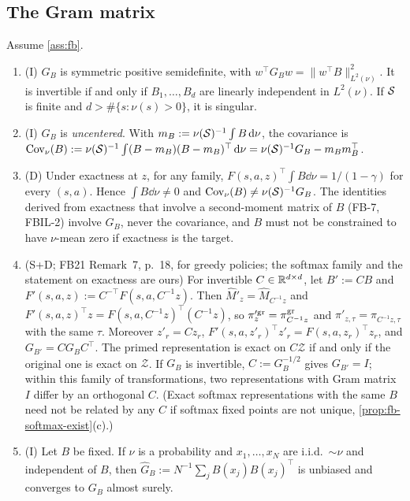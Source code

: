 \subsection{The Gram matrix}\label{sec:fb-gram}

\begin{proposition}\label{prop:fb-gram}
Assume \cref{ass:fb}.
\begin{enumerate}[nosep,label=(\alph*)]
\item (\textsf{I}) $G_B$ is symmetric positive semidefinite, with $w^\top G_Bw=\|w^\top B\|^2_{L^2(\nu)}$.
  It is invertible if and only if $B_1,\dots,B_d$ are linearly independent in $L^2(\nu)$.
  If $\mathcal{S}$ is finite and $d>\#\{s:\nu(s)>0\}$, it is singular.
\item (\textsf{I}) $G_B$ is \emph{uncentered}. With $m_B:=\nu(\mathcal{S})^{-1}\int B\,\mathrm{d}\nu$, the covariance is $\mathrm{Cov}_\nu(B):=\nu(\mathcal{S})^{-1}\int(B-m_B)(B-m_B)^\top\,\mathrm{d}\nu=\nu(\mathcal{S})^{-1}G_B-m_Bm_B^\top$.
\item (\textsf{D}) Under exactness at $z$, for any family, $F(s,a,z)^\top\int B\dd\nu=1/(1-\gamma)$ for every $(s,a)$.
  Hence $\int B\dd\nu\ne0$ and $\mathrm{Cov}_\nu(B)\ne\nu(\mathcal{S})^{-1}G_B$.
  The identities derived from exactness that involve a second-moment matrix of $B$ (FB-7, FBIL-2) involve $G_B$, never the covariance, and $B$ must not be constrained to have $\nu$-mean zero if exactness is the target.
\item (\textsf{S+D}; FB21 Remark~7, p.~18, for greedy policies; the softmax family and the statement on exactness are ours) For invertible $C\in\mathbb{R}^{d\times d}$, let $B':=CB$ and $F'(s,a,z):=C^{-\top}F(s,a,C^{-1}z)$.
  Then $\hat M'_z=\hat M_{C^{-1}z}$ and $F'(s,a,z)^\top z=F(s,a,C^{-1}z)^\top(C^{-1}z)$, so $\pi'^{\mathrm{gr}}_z=\pi^{\mathrm{gr}}_{C^{-1}z}$ and $\pi'_{z,\tau}=\pi_{C^{-1}z,\tau}$ with the same $\tau$.
  Moreover $z'_r=Cz_r$, $F'(s,a,z'_r)^\top z'_r=F(s,a,z_r)^\top z_r$, and $G_{B'}=CG_BC^\top$.
  The primed representation is exact on $C\mathcal Z$ if and only if the original one is exact on $\mathcal Z$.
  If $G_B$ is invertible, $C:=G_B^{-1/2}$ gives $G_{B'}=I$; within this family of transformations, two representations with Gram matrix $I$ differ by an orthogonal $C$.
  (Exact softmax representations with the same $B$ need not be related by any $C$ if softmax fixed points are not unique, \cref{prop:fb-softmax-exist}(c).)
\item (\textsf{I}) Let $B$ be fixed. If $\nu$ is a probability and $x_1,\dots,x_N$ are i.i.d.\ $\sim\nu$ and independent of $B$, then $\hat G_B:=N^{-1}\sum_jB(x_j)B(x_j)^\top$ is unbiased and converges to $G_B$ almost surely.

\end{enumerate}
\end{proposition}
